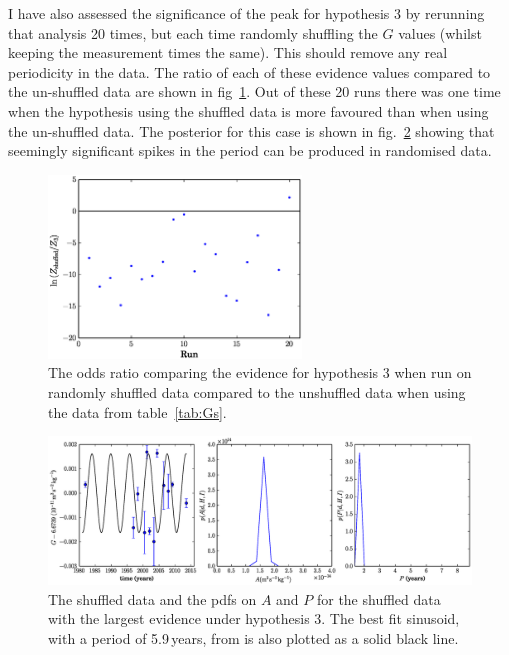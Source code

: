 \documentclass[page-classic]{epl2}
\begin{document}
I have also assessed the significance of the peak for hypothesis 3 by rerunning that analysis 20 times,
but each time randomly shuffling the $G$ values (whilst keeping the measurement times the same). This should remove
any real periodicity in the data. The ratio of each of these evidence values compared to the un-shuffled data are
shown in fig~\ref{fig:ensemble}. Out of these 20 runs there was one time when the hypothesis using the shuffled data
is more favoured than when using the un-shuffled data. The posterior for this case is shown in fig.~\ref{fig:shuf}
showing that seemingly significant spikes in the period can be produced in randomised data.

\begin{figure}
 \centerline{\includegraphics[width=0.6\textwidth]{ensemble}}
 \caption{The odds ratio comparing the evidence for hypothesis 3 when run on randomly shuffled data compared to
 the unshuffled data when using the data from table~\ref{tab:Gs}.}
 \label{fig:ensemble}
\end{figure}

\begin{figure}
 \centerline{\includegraphics[width=1.0\textwidth]{shuffled}}
 \caption{The shuffled data and the pdfs on $A$ and $P$ for the shuffled data with the largest evidence under
 hypothesis 3. The best fit sinusoid, with a period of 5.9\,years, from \cite{2015EL....11010002A} is also plotted
 as a solid black line.}
 \label{fig:shuf}
\end{figure}
\end{document}
